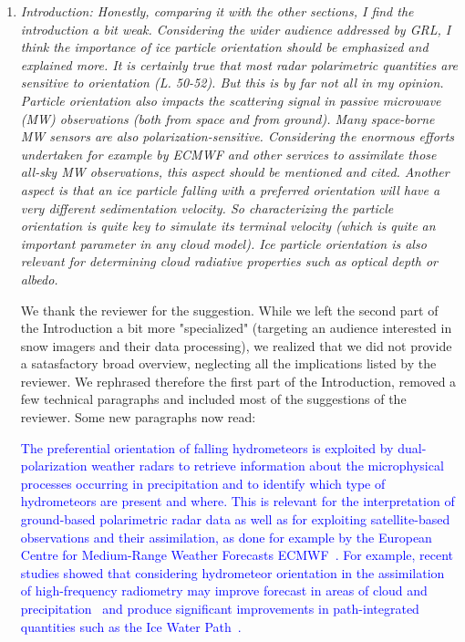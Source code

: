 \documentclass[12pt]{article}
\newcommand*{\blue}{\textcolor{blue}}
\begin{document}
\begin{enumerate}
    \item \textit{Introduction: Honestly, comparing it with the other sections, I find the introduction a bit weak. Considering the wider audience addressed by GRL, I think the importance of ice particle orientation should be emphasized and explained more. It is certainly true that most radar polarimetric quantities are sensitive to orientation (L. 50-52). But this is by far not all in my opinion. Particle orientation also impacts the scattering signal in passive microwave (MW) observations (both from space and from ground). Many space-borne MW sensors are also polarization-sensitive. Considering the enormous efforts undertaken for example by ECMWF and other services to assimilate those all-sky MW observations, this aspect should be mentioned and cited. Another aspect is that an ice particle falling with a preferred orientation will have a very different sedimentation velocity. So characterizing the particle orientation is quite key to simulate its terminal velocity (which is quite an important parameter in any cloud model). Ice particle orientation is also relevant for determining cloud radiative properties such as optical depth or albedo.}
    
    We thank the reviewer for the suggestion. While we left the second part of the Introduction a bit more "specialized" (targeting an audience interested in snow imagers and their data processing), we realized that we did not provide a satasfactory broad overview, neglecting all the implications listed by the reviewer. We rephrased therefore the first part of the Introduction, removed a few technical paragraphs and included most of the suggestions of the reviewer. Some new paragraphs now read:
    
    \blue{The preferential orientation of falling hydrometeors is exploited by dual-polarization weather radars to retrieve information about the microphysical processes occurring in precipitation and to identify which type of hydrometeors are present and where. This is relevant for the interpretation of ground-based polarimetric radar data as well as for exploiting satellite-based observations and their assimilation, as done for example by the European Centre for Medium-Range Weather Forecasts ECMWF~\cite{Eyre_QJRMS_2022}. For example, recent studies showed that considering hydrometeor orientation in the assimilation of high-frequency radiometry may improve forecast in areas of cloud and precipitation~\cite{Barlakas_AMT_2021} and produce significant improvements in path-integrated quantities such as the Ice Water Path~\cite{Kaur_RS_2022}. }


\end{enumerate}
\end{document}
